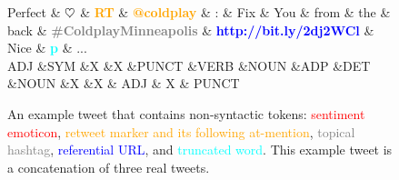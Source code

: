 \documentclass[11pt,a4paper]{article}
\newcommand{\heart}{\ensuremath\heartsuit}
\begin{document}
\begin{figure}[t]
	\centering
	\small
	\begin{dependency}[edge slant=2, text only label, label style=above]
		\begin{deptext}
			Perfect \& \textcolor{red}{\bf $\heart$} \& \textcolor{orange}{\bf RT} \& \textcolor{orange}{\bf @coldplay} \& : \& Fix \& You \& from \& the \& back \& \textcolor{gray}{\bf \#ColdplayMinneapolis} \& \textcolor{blue}{\bf http://bit.ly/2dj2WCl} \& Nice \& \textcolor{cyan}{\bf p} \& ...\\
			\tiny ADJ \&\tiny SYM \&\tiny X \&\tiny X \&\tiny PUNCT \&\tiny VERB \&\tiny NOUN \&\tiny ADP \&\tiny DET \&\tiny NOUN \&\tiny X \&\tiny X \& \tiny ADJ \& \tiny X \& \tiny PUNCT \\
		\end{deptext}
	\end{dependency}
	\caption{An example tweet that contains non-syntactic tokens:
		\textcolor{red}{sentiment emoticon},
		\textcolor{orange}{retweet marker and its following at-mention},
		\textcolor{gray}{topical hashtag},
		\textcolor{blue}{referential URL}, and
		\textcolor{cyan}{truncated word}.
		This example tweet is a concatenation of three real tweets.
	}\label{fig:non-syn-toks}
\end{figure}
\end{document}
